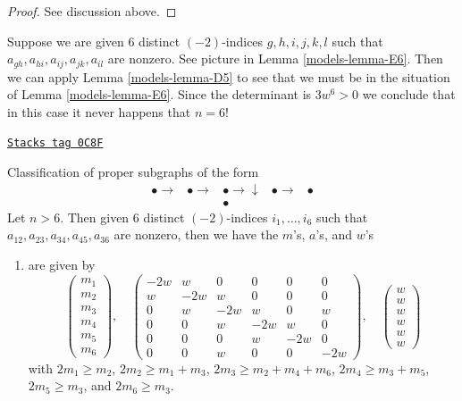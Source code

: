 \begin{proof}
See discussion above.
\end{proof}

Suppose we are given $6$ distinct $(-2)$-indices $g, h, i, j, k, l$
such that $a_{gh}, a_{hi}, a_{ij}, a_{jk}, a_{il}$ are nonzero.
See picture in Lemma \ref{models-lemma-E6}. Then we can apply
Lemma \ref{models-lemma-D5} to see that we must be in the situation
of Lemma \ref{models-lemma-E6}. Since the determinant is $3w^6 > 0$
we conclude that in this case it never happens that $n = 6$!

\begin{lemma}[E6]
\label{models-lemma-E6}
\href{https://stacks.math.columbia.edu/tag/0C8F}{\texttt{Stacks tag 0C8F}}

Classification of proper subgraphs of the form
$$
\begin{array}{ccccc}\bullet \longrightarrow & \bullet \longrightarrow & \bullet \longrightarrow\downarrow & \bullet \longrightarrow & \bullet \\  &  & \bullet &  & \end{array}
$$
Let $n > 6$. Then given $6$ distinct $(-2)$-indices $i_1, \ldots, i_6$
such that $a_{12}, a_{23}, a_{34}, a_{45}, a_{36}$ are nonzero, then
we have the $m$'s, $a$'s, and $w$'s
\begin{enumerate}
\item
\label{models-item-E6}
are given by
$$
\left(
\begin{matrix}
m_1 \\
m_2 \\
m_3 \\
m_4 \\
m_5 \\
m_6
\end{matrix}
\right),
\quad
\left(
\begin{matrix}
-2w & w & 0 & 0 & 0 & 0 \\
w & -2w & w & 0 & 0 & 0 \\
0 & w & -2w & w & 0 & w \\
0 & 0 & w & -2w & w & 0 \\
0 & 0 & 0 & w & -2w & 0 \\
0 & 0 & w & 0 & 0 & -2w
\end{matrix}
\right),
\quad
\left(
\begin{matrix}
w \\
w \\
w \\
w \\
w \\
w
\end{matrix}
\right)
$$
with $2m_1 \geq m_2$, $2m_2 \geq m_1 + m_3$, $2m_3 \geq m_2 + m_4 + m_6$,
$2m_4 \geq m_3 + m_5$, $2m_5 \geq m_3$, and $2m_6 \geq m_3$.
\end{enumerate}
\end{lemma}

